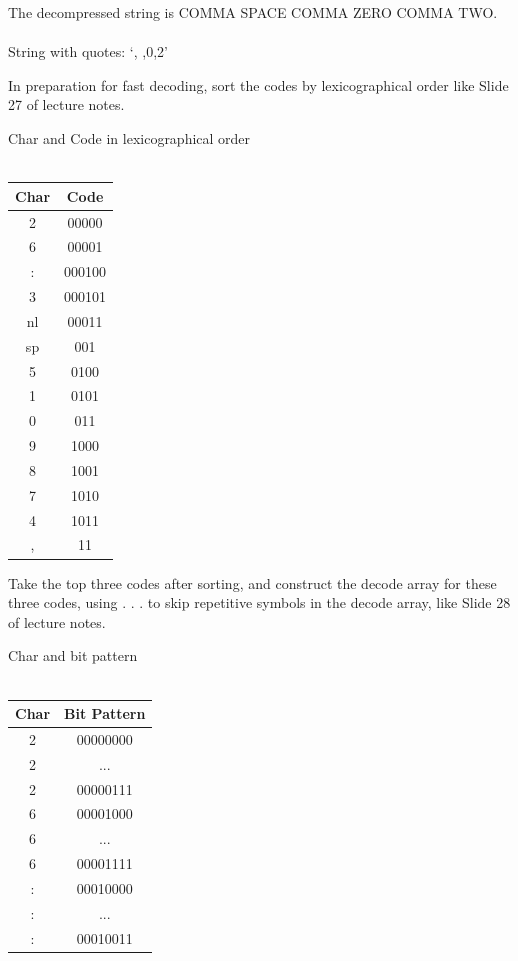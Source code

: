 \documentclass[10pt]{article}
\newenvironment{exercise}[2][Exercise]{\begin{trivlist}
\item[\hskip \labelsep {\bfseries #1}\hskip \labelsep {\bfseries #2.}]}{\end{trivlist}}
\newenvironment{solution}[2][Solution]{\begin{trivlist}
\item[\hskip \labelsep {\bfseries #1}\hskip \labelsep {\bfseries #2.}]}{\end{trivlist}}
\theoremstyle{definition}
\begin{document}
\begin{solution}{(1D)}
The decompressed string is COMMA SPACE COMMA ZERO COMMA TWO.\\
\\
String with quotes: `, ,0,2'\\

\end{solution}

\begin{exercise}{(1E)}
In preparation for fast decoding, sort the codes by lexicographical order like Slide 27 of
lecture notes.
\end{exercise}

\begin{solution}{(1E)}
Char and Code in lexicographical order\\
\\
\begin{tabular}{c|c}
Char & Code\\
\hline
2 & 00000\\
\hline
6 & 00001\\
\hline
: & 000100\\
\hline
3 & 000101\\
\hline
nl & 00011\\
\hline
sp & 001\\
\hline
5 & 0100\\
\hline
1 & 0101\\
\hline
0 & 011\\
\hline
9 & 1000\\
\hline
8 & 1001\\
\hline
7 & 1010\\
\hline
4 & 1011\\
\hline
, & 11\\
\end{tabular}
\end{solution}

\begin{exercise}{(1F)}
Take the top three codes after sorting, and construct the decode array for these three
codes, using . . . to skip repetitive symbols in the decode array, like Slide 28 of lecture
notes.
\end{exercise}

\begin{solution}{(1F)}
Char and bit pattern\\
\\
\begin{tabular}{c|c}
Char & Bit Pattern\\
\hline
2 & 00000000\\
\hline
2 & ...\\
\hline
2 & 00000111\\
\hline
6 & 00001000\\
\hline
6 & ...\\
\hline
6 & 00001111\\
\hline
: & 00010000\\
\hline
: & ...\\
\hline
: & 00010011\\
\end{tabular}
\end{solution}
 
\end{document}
